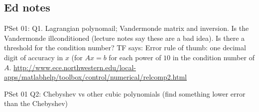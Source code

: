 \documentclass[12pt,letterpaper]{exam}
\begin{document}
\subsection{Ed notes}
PSet 01: Q1. Lagrangian polynomail; Vandermonde matrix and inversion.  Is the Vandermonde illconditioned (lecture notes say these are a bad idea).  Is there a threshold for the condition number? TF says: Error rule of thumb: one decimal digit of accuracy in $x$ (for $Ax = b$ for each power of $10$ in the condition number of $A$.   \url{http://www.ece.northwestern.edu/local-apps/matlabhelp/toolbox/control/numerical/relcomp2.html}

PSet 01 Q2: Chebyshev vs other cubic polynomials (find something lower error than the Chebyshev)
\end{document}

